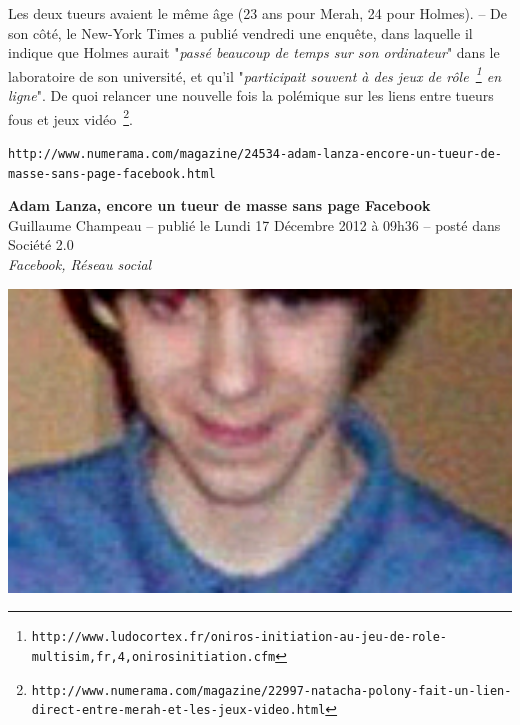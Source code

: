 \documentclass[11pt,twoside,a4paper]{article}
\begin{document}
Les deux tueurs avaient le m{\^e}me {\^a}ge (23 ans pour Merah, 24 pour Holmes). -- De son c{\^o}t{\'e}, le New-York Times a publi{\'e} vendredi une enqu{\^e}te, dans laquelle il indique que Holmes aurait "\emph{pass{\'e} beaucoup de temps sur son ordinateur}" dans le laboratoire de son universit{\'e}, et qu'il "\emph{participait souvent {\`a} des jeux de r{\^o}le~\footnote{\texttt{http://www.ludocortex.fr/oniros-initiation-au-jeu-de-role-multisim,fr,4,onirosinitiation.cfm}} en ligne}". De quoi relancer une nouvelle fois la pol{\'e}mique sur les liens entre tueurs fous et jeux vid{\'e}o~\footnote{\texttt{http://www.numerama.com/magazine/22997-natacha-polony-fait-un-lien-direct-entre-merah-et-les-jeux-video.html}}. %

\clearpage

\texttt{http://www.numerama.com/magazine/24534-adam-lanza-encore-un-tueur-de-masse-sans-page-facebook.html}~\\

\begin{minipage}[ht]{0.70\textwidth} 
	\textbf{\LARGE Adam Lanza, encore un tueur de masse sans page Facebook}~\\
	
	Guillaume Champeau -- publi{\'e} le Lundi 17 D{\'e}cembre 2012 {\`a} 09h36 -- post{\'e} dans Soci{\'e}t{\'e} 2.0~\footnotemark~\\

	\emph{\small Facebook, R{\'e}seau social}~\\
\end{minipage} \hfill \begin{minipage}[ht]{0.28\textwidth} 
	\includegraphics[width=1.00\textwidth]{img/lanza.png}
\end{minipage}
\end{document}
